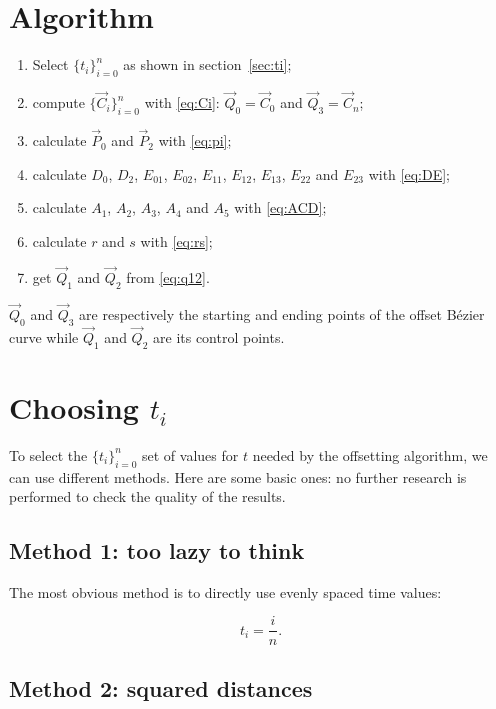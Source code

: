 \documentclass{scrartcl}
\newcommand\V[1]{\vec{#1}}
\begin{document}
\section{Algorithm}

\begin{enumerate}
    \item Select $\{t_i\}_{i=0}^n$ as shown in section~\ref{sec:ti};
    \item compute $\{\V{C}_i\}_{i=0}^n$ with \eqref{eq:Ci}:
	$\V{Q}_0 = \V{C}_0$ and $\V{Q}_3 = \V{C}_n$;
    \item calculate $\V{P}_0$ and $\V{P}_2$ with \eqref{eq:pi};
    \item calculate $D_0$, $D_2$, $E_{01}$, $E_{02}$, $E_{11}$,
	$E_{12}$, $E_{13}$, $E_{22}$ and $E_{23}$ with \eqref{eq:DE};
    \item calculate $A_1$, $A_2$, $A_3$, $A_4$ and $A_5$ with
	\eqref{eq:ACD};
    \item calculate $r$ and $s$ with \eqref{eq:rs};
    \item get $\V{Q}_1$ and $\V{Q}_2$ from \eqref{eq:q12}.
\end{enumerate}

$\V{Q}_0$ and $\V{Q}_3$ are respectively the starting and ending
points of the offset Bézier curve while $\V{Q}_1$ and $\V{Q}_2$ are
its control points.

\clearpage
\section{Choosing $t_i$\label{sec:ti}}

To select the $\{t_i\}_{i=0}^n$ set of values for $t$ needed by
the offsetting algorithm, we can use different methods. Here are some
basic ones: no further research is performed to check the quality of
the results.

\subsection{Method 1: too lazy to think}

The most obvious method is to directly use evenly spaced time values:

\begin{equation*}
    t_i = \frac{i}{n}.
\end{equation*}

\subsection{Method 2: squared distances}
\end{document}
